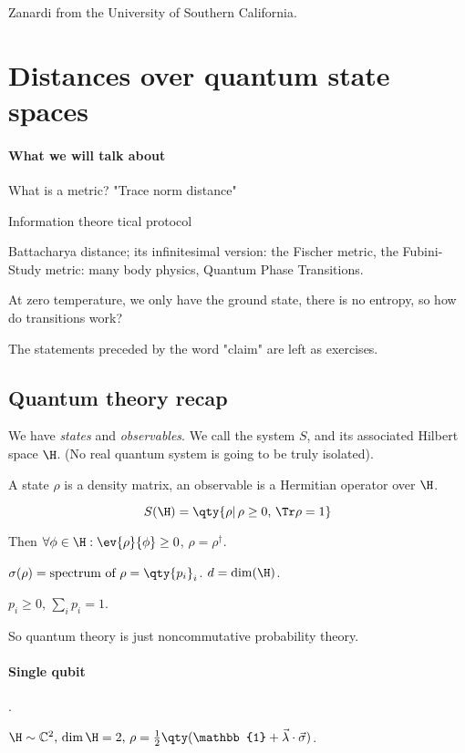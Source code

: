 Zanardi from the University of Southern California.

\section{Distances over quantum state spaces}

\paragraph{What we will talk about}

What is a metric? "Trace norm distance"

Information theore
tical protocol

Battacharya distance; its infinitesimal version: the Fischer metric, the Fubini-Study metric: many body physics, Quantum Phase Transitions.

At zero temperature, we only have the ground state, there is no entropy, so how do transitions work?

The statements preceded by the word "claim" are left as exercises.

\subsection{Quantum theory recap}

We have \emph{states} and \emph{observables}. We call the system $S$, and its associated Hilbert space \(\H\). (No real quantum system is going to be truly isolated).

A state \(\rho\) is a density matrix, an observable is a Hermitian operator over \(\H\).

\begin{equation}
  S(\H) = \qty{\rho |\, \rho \geq 0, \, \Tr \rho = 1}
\end{equation}

Then \(\forall \phi \in \H: \ev{\rho}{\phi} \geq 0\), \(\rho = \rho ^\dag\).

\(\sigma (\rho) = \text{spectrum of } \rho = \qty{p_i}_i\). \(d = \dim (\H)\).

\(p_i \geq 0\), \(\sum_i p_i = 1\).

So quantum theory is just noncommutative probability theory.

\paragraph{Single qubit}.

\(\H \sim \mathbb{C}^2$, $\dim \H = 2$, $\rho = \frac{1}{2} \qty(\mathbb{1} + \vec{\lambda} \cdot \vec{\sigma})\).

